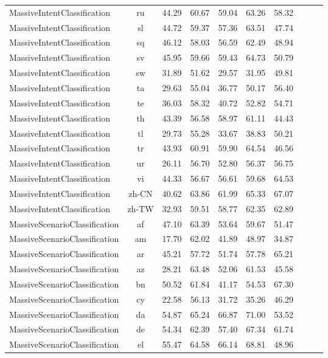 \documentclass[11pt]{article}
\begin{document}
\begin{table*}[t!]
{\begin{tabular}{lc|cccccccc}
MassiveIntentClassification & ru & 44.29 & 60.67 & 59.04 & 63.26 & 58.32 \\
MassiveIntentClassification & sl & 44.72 & 59.37 & 57.36 & 63.51 & 47.74 \\
MassiveIntentClassification & sq & 46.12 & 58.03 & 56.59 & 62.49 & 48.94 \\
MassiveIntentClassification & sv & 45.95 & 59.66 & 59.43 & 64.73 & 50.79 \\
MassiveIntentClassification & sw & 31.89 & 51.62 & 29.57 & 31.95 & 49.81 \\
MassiveIntentClassification & ta & 29.63 & 55.04 & 36.77 & 50.17 & 56.40 \\
MassiveIntentClassification & te & 36.03 & 58.32 & 40.72 & 52.82 & 54.71 \\
MassiveIntentClassification & th & 43.39 & 56.58 & 58.97 & 61.11 & 44.43 \\
MassiveIntentClassification & tl & 29.73 & 55.28 & 33.67 & 38.83 & 50.21 \\
MassiveIntentClassification & tr & 43.93 & 60.91 & 59.90 & 64.54 & 46.56 \\
MassiveIntentClassification & ur & 26.11 & 56.70 & 52.80 & 56.37 & 56.75 \\
MassiveIntentClassification & vi & 44.33 & 56.67 & 56.61 & 59.68 & 64.53 \\
MassiveIntentClassification & zh-CN & 40.62 & 63.86 & 61.99 & 65.33 & 67.07 \\
MassiveIntentClassification & zh-TW & 32.93 & 59.51 & 58.77 & 62.35 & 62.89 \\
MassiveScenarioClassification & af & 47.10 & 63.39 & 53.64 & 59.67 & 51.47 \\
MassiveScenarioClassification & am & 17.70 & 62.02 & 41.89 & 48.97 & 34.87 \\
MassiveScenarioClassification & ar & 45.21 & 57.72 & 51.74 & 57.78 & 65.21 \\
MassiveScenarioClassification & az & 28.21 & 63.48 & 52.06 & 61.53 & 45.58 \\
MassiveScenarioClassification & bn & 50.52 & 61.84 & 41.17 & 54.53 & 67.30 \\
MassiveScenarioClassification & cy & 22.58 & 56.13 & 31.72 & 35.26 & 46.29 \\
MassiveScenarioClassification & da & 54.87 & 65.24 & 66.87 & 71.00 & 53.52 \\
MassiveScenarioClassification & de & 54.34 & 62.39 & 57.40 & 67.34 & 61.74 \\
MassiveScenarioClassification & el & 55.47 & 64.58 & 66.14 & 68.81 & 48.96 \\

\end{tabular}}
\end{table*}
\end{document}
